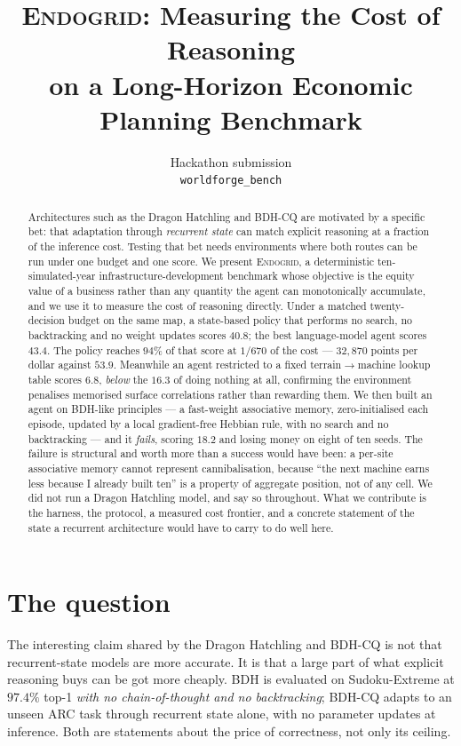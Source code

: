 \documentclass{article}
\title{\textsc{Endogrid}: Measuring the Cost of Reasoning\\on a Long-Horizon
       Economic Planning Benchmark}
\author{%
  \normalsize
  Hackathon submission\\
  \texttt{worldforge\_bench}
}
\begin{document}
\maketitle

\begin{abstract}
Architectures such as the Dragon Hatchling \citep{kosowski2025bdh} and BDH-CQ
\citep{engdahl2026bdhcq} are motivated by a specific bet: that adaptation
through \emph{recurrent state} can match explicit reasoning at a fraction of the
inference cost. Testing that bet needs environments where both routes can be
run under one budget and one score. We present \textsc{Endogrid}, a
deterministic ten-simulated-year infrastructure-development benchmark whose
objective is the equity value of a business rather than any quantity the agent
can monotonically accumulate, and we use it to measure the cost of reasoning
directly. Under a matched twenty-decision budget on the same map, a
state-based policy that performs no search, no backtracking and no weight
updates scores $40.8$; the best language-model agent scores $43.4$. The policy
reaches $94\%$ of that score at $1/670$ of the cost --- $32{,}870$ points per
dollar against $53.9$. Meanwhile an agent restricted to a fixed
terrain$\rightarrow$machine lookup table scores $6.8$, \emph{below} the $16.3$
of doing nothing at all, confirming the environment penalises memorised
surface correlations rather than rewarding them. We then built an agent on BDH-like principles --- a fast-weight associative
memory, zero-initialised each episode, updated by a local gradient-free Hebbian
rule, with no search and no backtracking --- and it \emph{fails}, scoring $18.2$
and losing money on eight of ten seeds. The failure is structural and worth more
than a success would have been: a per-site associative memory cannot represent
cannibalisation, because ``the next machine earns less because I already built
ten'' is a property of aggregate position, not of any cell. We did not run a
Dragon Hatchling model, and say so throughout. What we contribute is the
harness, the protocol, a measured cost frontier, and a concrete statement of the
state a recurrent architecture would have to carry to do well here.
\end{abstract}

\section{The question}

The interesting claim shared by the Dragon Hatchling \citep{kosowski2025bdh} and
BDH-CQ \citep{engdahl2026bdhcq} is not that recurrent-state models are more
accurate. It is that a large part of what explicit reasoning buys can be got
more cheaply. BDH is evaluated on Sudoku-Extreme at $97.4\%$ top-1 \emph{with no
chain-of-thought and no backtracking}; BDH-CQ adapts to an unseen ARC task
through recurrent state alone, with no parameter updates at inference. Both are
statements about the price of correctness, not only its ceiling.
\end{document}
